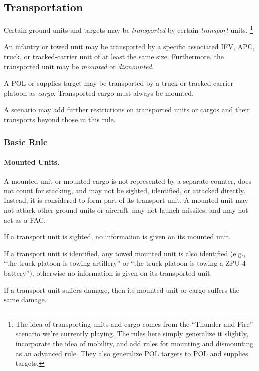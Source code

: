\documentclass[10pt]{article}
\newcommand{\note}[1]{%
    \footnote{%
        \setlength{\parindent}{0pt}%
        \setlength{\parskip}{\smallskipamount}%
        #1
    }%
}
\begin{document}
\subsection{Transportation}

Certain ground units and targets may be \emph{transported} by certain \emph{transport} units.%
\note{
    The idea of transporting units and cargo comes from the “Thunder and Fire” scenario we're currently playing. The rules here simply generalize it slightly, incorporate the idea of mobility, and add rules for mounting and dismounting as an advanced rule. They also generalize POL targets to POL and supplies targets.
}

An infantry or towed unit may be transported by a specific associated IFV, APC, truck, or tracked-carrier unit of at least the same size.
Furthermore, the transported unit may be \emph{mounted} or \emph{dismounted}.

A POL or supplies target may be transported by a truck or tracked-carrier platoon as \emph{cargo}.
Transported cargo must always be mounted.

A scenario may add further restrictions on transported units or cargos and their transports beyond those in this rule.
\subsubsection{Basic Rule}

\paragraph{Mounted Units.}

A mounted unit or mounted cargo is not represented by a separate counter, does not count for stacking, and may not be sighted, identified, or attacked directly.
Instead, it is considered to form part of its transport unit. A mounted unit may not attack other ground units or aircraft, may not launch missiles, and may not act as a FAC.

If a transport unit is sighted, no information is given on its mounted unit.

If a transport unit is identified, any towed mounted unit is also identified (e.g., ``the truck platoon is towing artillery'' or ``the truck platoon is towing a ZPU-4 battery''), otherwise no information is given on its transported unit.

If a transport unit suffers damage, then its mounted unit or cargo suffers the same damage.
\end{document}
